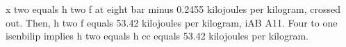 x two equals h two f at eight bar minus 0.2455 kilojoules per kilogram, crossed out. Then, h two f equals 53.42 kilojoules per kilogram, iAB A11. Four to one isenbilip implies h two equals h cc equals 53.42 kilojoules per kilogram.